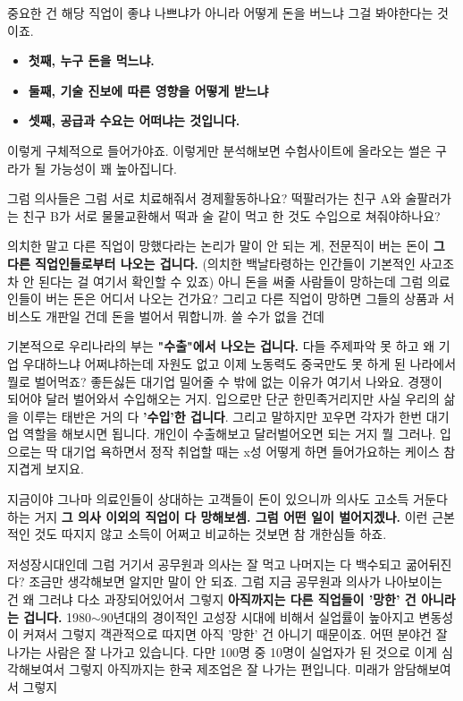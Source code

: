 중요한 건 해당 직업이 좋냐 나쁘냐가 아니라 어떻게 돈을 버느냐 그걸 봐야한다는 것이죠.
\begin{itemize}
    \item \textbf{첫째, 누구 돈을 먹느냐.}
    \item \textbf{둘째, 기술 진보에 따른 영향을 어떻게 받느냐}
    \item \textbf{셋째, 공급과 수요는 어떠냐는 것입니다.}
\end{itemize}
이렇게 구체적으로 들어가야죠. 이렇게만 분석해보면 수험사이트에 올라오는 썰은 구라가 될 가능성이 꽤 높아집니다.
\vspace{5mm}

그럼 의사들은 그럼 서로 치료해줘서 경제활동하나요?
떡팔러가는 친구 A와 술팔러가는 친구 B가 서로 물물교환해서 떡과 술 같이 먹고 한 것도 수입으로 쳐줘야하나요?
\vspace{5mm}

의치한 말고 다른 직업이 망했다라는 논리가 말이 안 되는 게, 전문직이 버는 돈이 \textbf{그 다른 직업인들로부터 나오는 겁니다.}
(의치한 백날타령하는 인간들이 기본적인 사고조차 안 된다는 걸 여기서 확인할 수 있죠)
아니 돈을 써줄 사람들이 망하는데 그럼 의료인들이 버는 돈은 어디서 나오는 건가요?
그리고 다른 직업이 망하면 그들의 상품과 서비스도 개판일 건데 돈을 벌어서 뭐합니까. 쓸 수가 없을 건데
\vspace{5mm}

기본적으로 우리나라의 부는 \textbf{"수출"에서 나오는 겁니다.}
다들 주제파악 못 하고 왜 기업 우대하느냐 어쩌냐하는데 자원도 없고 이제 노동력도 중국만도 못 하게 된 나라에서 뭘로 벌어먹죠?
좋든싫든 대기업 밀어줄 수 밖에 없는 이유가 여기서 나와요. 경쟁이 되어야 달러 벌어와서 수입해오는 거지.
입으로만 단군 한민족거리지만 사실 우리의 삶을 이루는 태반은 거의 다 \textbf{'수입'한 겁니다}.
그리고 말하지만 꼬우면 각자가 한번 대기업 역할을 해보시면 됩니다. 개인이 수출해보고 달러벌어오면 되는 거지 뭘 그러나.
입으로는 딱 대기업 욕하면서 정작 취업할 때는 x성 어떻게 하면 들어가요하는 케이스 참 지겹게 보지요.
\vspace{5mm}

지금이야 그나마 의료인들이 상대하는 고객들이 돈이 있으니까 의사도 고소득 거둔다하는 거지
\textbf{그 의사 이외의 직업이 다 망해보셈. 그럼 어떤 일이 벌어지겠나.}
이런 근본적인 것도 따지지 않고 소득이 어쩌고 비교하는 것보면 참 개한심들 하죠.
\vspace{5mm}

저성장시대인데 그럼 거기서 공무원과 의사는 잘 먹고 나머지는 다 백수되고 굶어뒤진다?
조금만 생각해보면 알지만 말이 안 되죠.
그럼 지금 공무원과 의사가 나아보이는 건 왜 그러냐
다소 과장되어있어서 그렇지 \textbf{아직까지는 다른 직업들이 '망한' 건 아니라는 겁니다.}
1980$\sim$90년대의 경이적인 고성장 시대에 비해서 실업률이 높아지고 변동성이 커져서 그렇지
객관적으로 따지면 아직 '망한' 건 아니기 때문이죠. 어떤 분야건 잘 나가는 사람은 잘 나가고 있습니다.
다만 100명 중 10명이 실업자가 된 것으로 이게 심각해보여서 그렇지 아직까지는 한국 제조업은 잘 나가는 편입니다.
미래가 암담해보여서 그렇지
\vspace{5mm}

